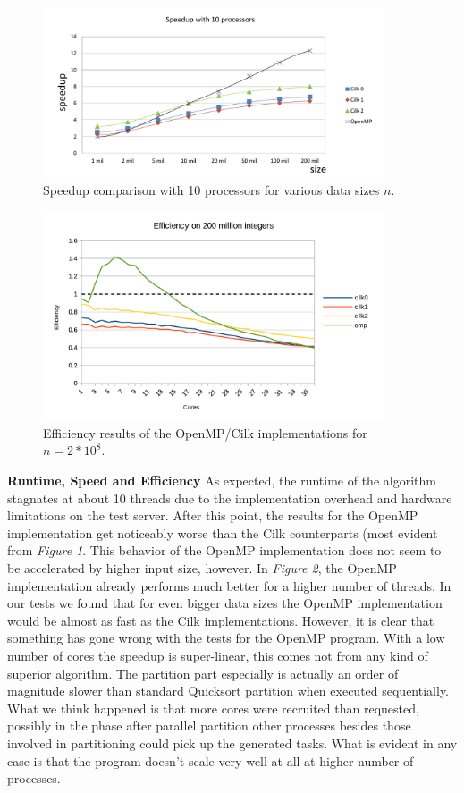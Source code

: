 \documentclass[12pt,a4paper]{article}
\begin{document}
\begin{figure}[h]
	\includegraphics[width=0.9\textwidth]{img/omp_cilk_speedup_10p.pdf}
	\caption{Speedup comparison with 10 processors for various data sizes $n$.}
\end{figure}
\begin{figure}[h]
	\includegraphics[width=0.9\textwidth]{img/eff_200_mil.pdf}
	\caption{Efficiency results of the OpenMP/Cilk implementations for $n=2*10^8$.}
\end{figure}

\noindent\textbf{Runtime, Speed and Efficiency}\newline
As expected, the runtime of the algorithm stagnates at about 10 threads due to the implementation overhead and hardware limitations on the test server. After this point, the results for the OpenMP implementation get noticeably worse than the Cilk counterparts (most evident from \emph{Figure 1}. This behavior of the OpenMP implementation does not seem to be accelerated by higher input size, however. In \emph{Figure 2}, the OpenMP implementation already performs much better for a higher number of threads. In our tests we found that for even bigger data sizes the OpenMP implementation would be almost as fast as the Cilk implementations. However, it is clear that something has gone wrong with the tests for the OpenMP program. With a low number of cores the speedup is super-linear, this comes not from any kind of superior algorithm. The partition part especially is actually an order of magnitude slower than standard Quicksort partition when executed sequentially. What we think happened is that more cores were recruited than requested, possibly in the phase after parallel partition other processes besides those involved in partitioning could pick up the generated tasks. What is evident in any case is that the program doesn't scale very well at all at higher number of processes.
\end{document}
